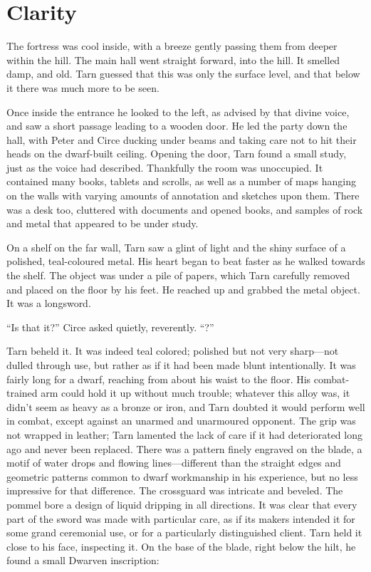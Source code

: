 \chapter{Clarity}

The fortress was cool inside, with a breeze gently passing them from deeper within the hill.  The main hall went straight forward, into the hill.  It smelled damp, and old.  Tarn guessed that this was only the surface level, and that below it there was much more to be seen.

Once inside the entrance he looked to the left, as advised by that divine voice, and saw a short passage leading to a wooden door.  He led the party down the hall, with Peter and Circe ducking under beams and taking care not to hit their heads on the dwarf-built ceiling.  Opening the door, Tarn found a small study, just as the voice had described.  Thankfully the room was unoccupied.  It contained many books, tablets and scrolls, as well as a number of maps hanging on the walls with varying amounts of annotation and sketches upon them.  There was a desk too, cluttered with documents and opened books, and samples of rock and metal that appeared to be under study.

On a shelf on the far wall, Tarn saw a glint of light and the shiny surface of a polished, teal-coloured metal.  His heart began to beat faster as he walked towards the shelf.  The object was under a pile of papers, which Tarn carefully removed and placed on the floor by his feet.  He reached up and grabbed the metal object.  It was a longsword.

``Is that it?'' Circe asked quietly, reverently.  ``\kildir?''

Tarn beheld it.  It was indeed teal colored; polished but not very sharp---not dulled through use, but rather as if it had been made blunt intentionally.  It was fairly long for a dwarf, reaching from about his waist to the floor.  His combat-trained arm could hold it up without much trouble; whatever this alloy was, it didn't seem as heavy as a bronze or iron, and Tarn doubted it would perform well in combat, except against an unarmed and unarmoured opponent.  The grip was not wrapped in leather; Tarn lamented the lack of care if it had deteriorated long ago and never been replaced.  There was a pattern finely engraved on the blade, a motif of water drops and flowing lines---different than the straight edges and geometric patterns common to dwarf workmanship in his experience, but no less impressive for that difference.  The crossguard was intricate and beveled.  The pommel bore a design of liquid dripping in all directions.  It was clear that every part of the sword was made with particular care, as if its makers intended it for some grand ceremonial use, or for a particularly distinguished client.  Tarn held it close to his face, inspecting it.  On the base of the blade, right below the hilt, he found a small Dwarven inscription:

